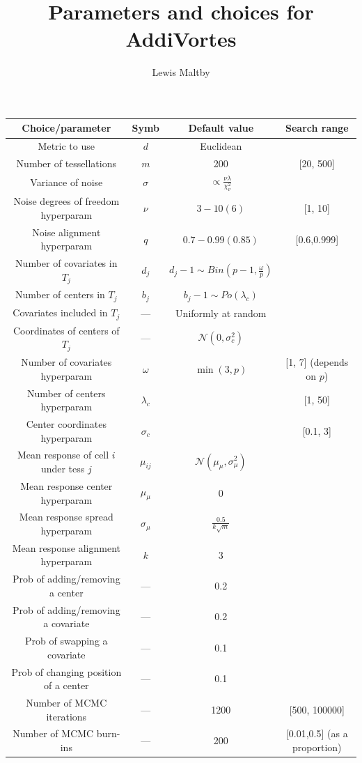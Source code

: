\documentclass[11pt,twoside,a4paper]{article}
\title{Parameters and choices for AddiVortes}
\author{Lewis Maltby}
\begin{document}
\maketitle
\begin{center}
\begin{tabular}{ |c|c|c|c| }
\hline
\textbf{Choice/parameter} & \textbf{Symb} & \textbf{Default value} & \textbf{Search range} \\
\hline\hline
Metric to use & $d$ & Euclidean&\\
Number of tessellations & $m$ & 200 & [20, 500]\\
\hline\hline
Variance of noise & $\sigma$ & $\propto \frac{ \nu \lambda }{ \chi^2 _\nu }$\footnotemark[1]&\\[0.1cm]
\hline
Noise degrees of freedom hyperparam & $\nu$ & $3-10(6)$ & [1, 10]\\
Noise alignment hyperparam & $q$ & $0.7-0.99(0.85)$ & [0.6,0.999]\\
\hline\hline
Number of covariates in $T_j$ & $d_j$ & $d_j-1\sim Bin(p-1,\frac{\omega}{p})$& \\
Number of centers in $T_j$ & $b_j$ &$b_j-1\sim Po(\lambda_c)$& \\
Covariates included in $T_j$ &--- & Uniformly at random& \\
Coordinates of centers of $T_j$ & --- & $\mathcal{N}(0, \sigma^2_c)$\footnotemark[2]&\\
\hline
Number of covariates hyperparam & $\omega$ & $\min(3, p)$ & [1, 7] (depends on $p$) \\
Number of centers hyperparam & $\lambda_c$  & & [1, 50] \\
Center coordinates hyperparam & $\sigma_c$ & & [0.1, 3]\\
\hline
\hline
Mean response of cell $i$ under tess $j$ & $\mu_{ij}$ & $\mathcal{N}(\mu_\mu, \sigma_\mu^2)$&\\
\hline
Mean response center hyperparam & $\mu_\mu$ & 0\footnotemark[3]&\\
Mean response spread hyperparam & $\sigma_\mu$ & $\frac{0.5}{k\sqrt{m}}$\footnotemark[4]&\\
Mean response alignment hyperparam & $k$ & $3$&\\
\hline\hline
Prob of adding/removing a center & --- & 0.2&\\
Prob of adding/removing a covariate & --- & 0.2&\\
Prob of swapping a covariate & --- & 0.1&\\
Prob of changing position of a center & --- & 0.1&\\
\hline\hline
Number of MCMC iterations & --- & 1200 & [500, 100000] \\
Number of MCMC burn-ins & --- & 200 & [0.01,0.5] (as a proportion) \\
\hline
\end{tabular}
\end{center}
\end{document}
